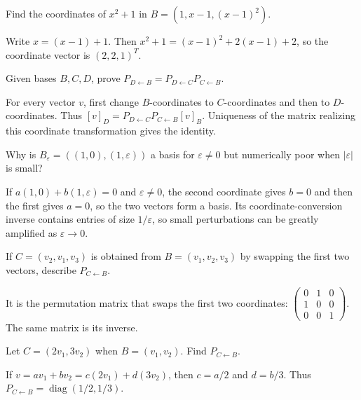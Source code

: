 \begin{problem}\label{prob:i04-problem-02}
Find the coordinates of $x^2+1$ in $B=(1,x-1,(x-1)^2)$.
\end{problem}
\begin{solution}
Write $x=(x-1)+1$. Then $x^2+1=(x-1)^2+2(x-1)+2$, so the coordinate vector is $(2,2,1)^T$.
\end{solution}

\begin{problem}\label{prob:i04-problem-03}
Given bases $B,C,D$, prove $P_{D\leftarrow B}=P_{D\leftarrow C}P_{C\leftarrow B}$.
\end{problem}
\begin{solution}
For every vector $v$, first change $B$-coordinates to $C$-coordinates and then to $D$-coordinates. Thus $[v]_D=P_{D\leftarrow C}P_{C\leftarrow B}[v]_B$. Uniqueness of the matrix realizing this coordinate transformation gives the identity.
\end{solution}

\begin{problem}\label{prob:i04-problem-04}
Why is $B_\varepsilon=((1,0),(1,\varepsilon))$ a basis for $\varepsilon\ne0$ but numerically poor when $|\varepsilon|$ is small?
\end{problem}
\begin{solution}
If $a(1,0)+b(1,\varepsilon)=0$ and $\varepsilon\ne0$, the second coordinate gives $b=0$ and then the first gives $a=0$, so the two vectors form a basis. Its coordinate-conversion inverse contains entries of size $1/\varepsilon$, so small perturbations can be greatly amplified as $\varepsilon\to0$.
\end{solution}

\begin{problem}\label{prob:i04-problem-05}
If $C=(v_2,v_1,v_3)$ is obtained from $B=(v_1,v_2,v_3)$ by swapping the first two vectors, describe $P_{C\leftarrow B}$.
\end{problem}
\begin{solution}
It is the permutation matrix that swaps the first two coordinates: $\begin{pmatrix}0&1&0\\1&0&0\\0&0&1\end{pmatrix}$. The same matrix is its inverse.
\end{solution}

\begin{problem}\label{prob:i04-problem-06}
Let $C=(2v_1,3v_2)$ when $B=(v_1,v_2)$. Find $P_{C\leftarrow B}$.
\end{problem}
\begin{solution}
If $v=a v_1+b v_2=c(2v_1)+d(3v_2)$, then $c=a/2$ and $d=b/3$. Thus $P_{C\leftarrow B}=\operatorname{diag}(1/2,1/3)$.
\end{solution}

